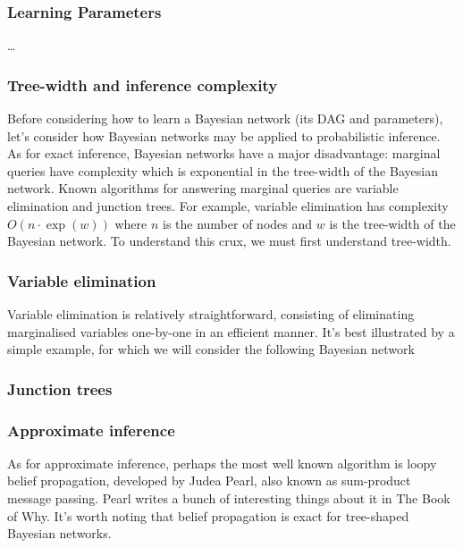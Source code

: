 \documentclass[11pt]{article}
\begin{document}
\subsubsection{\TODO Learning Parameters}
\dots

\subsubsection{\TODO Tree-width and inference complexity}
Before considering how to learn a Bayesian network (its DAG and parameters), let's consider how Bayesian networks may be applied to probabilistic inference. As for exact inference, Bayesian networks have a major disadvantage: marginal queries have complexity which is exponential in the tree-width of the Bayesian network. Known algorithms for answering marginal queries are variable elimination and junction trees. For example, variable elimination has complexity $O(n\cdot\exp(w))$ where $n$ is the number of nodes and $w$ is the tree-width of the Bayesian network. To understand this crux, we must first understand tree-width.

\subsubsection*{Variable elimination}
Variable elimination is relatively straightforward, consisting of eliminating marginalised variables one-by-one in an efficient manner. It's best illustrated by a simple example, for which we will consider the following Bayesian network
\begin{center}
    \end{center}

\subsubsection*{Junction trees}

\subsubsection*{Approximate inference}
As for approximate inference, perhaps the most well known algorithm is loopy belief propagation, developed by Judea Pearl, also known as sum-product message passing. Pearl writes a bunch of interesting things about it in The Book of Why. It's worth noting that belief propagation is exact for tree-shaped Bayesian networks.
\end{document}
